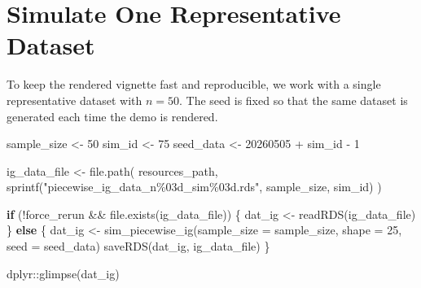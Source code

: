 \documentclass[
  english,
  letterpaper,
  DIV=11,
  numbers=noendperiod]{scrartcl}
\newenvironment{Shaded}{\begin{snugshade}}{\end{snugshade}}
\newcommand{\AttributeTok}[1]{\textcolor[rgb]{0.40,0.45,0.13}{#1}}
\newcommand{\ConstantTok}[1]{\textcolor[rgb]{0.56,0.35,0.01}{#1}}
\newcommand{\ControlFlowTok}[1]{\textcolor[rgb]{0.00,0.23,0.31}{\textbf{#1}}}
\newcommand{\DecValTok}[1]{\textcolor[rgb]{0.68,0.00,0.00}{#1}}
\newcommand{\FunctionTok}[1]{\textcolor[rgb]{0.28,0.35,0.67}{#1}}
\newcommand{\NormalTok}[1]{\textcolor[rgb]{0.00,0.23,0.31}{#1}}
\newcommand{\OtherTok}[1]{\textcolor[rgb]{0.00,0.23,0.31}{#1}}
\newcommand{\SpecialCharTok}[1]{\textcolor[rgb]{0.37,0.37,0.37}{#1}}
\newcommand{\StringTok}[1]{\textcolor[rgb]{0.13,0.47,0.30}{#1}}
\begin{document}
\begin{Shaded}
\end{Shaded}

\section{Simulate One Representative
Dataset}\label{simulate-one-representative-dataset}

To keep the rendered vignette fast and reproducible, we work with a
single representative dataset with \(n=50\). The seed is fixed so that
the same dataset is generated each time the demo is rendered.

\begin{Shaded}
\begin{Highlighting}[]
\NormalTok{sample\_size }\OtherTok{\textless{}{-}} \DecValTok{50}
\NormalTok{sim\_id }\OtherTok{\textless{}{-}} \DecValTok{75}
\NormalTok{seed\_data }\OtherTok{\textless{}{-}} \DecValTok{20260505} \SpecialCharTok{+}\NormalTok{ sim\_id }\SpecialCharTok{{-}} \DecValTok{1}

\NormalTok{ig\_data\_file }\OtherTok{\textless{}{-}} \FunctionTok{file.path}\NormalTok{(}
\NormalTok{  resources\_path,}
  \FunctionTok{sprintf}\NormalTok{(}\StringTok{"piecewise\_ig\_data\_n\%03d\_sim\%03d.rds"}\NormalTok{, sample\_size, sim\_id)}
\NormalTok{)}

\ControlFlowTok{if}\NormalTok{ (}\SpecialCharTok{!}\NormalTok{force\_rerun }\SpecialCharTok{\&\&} \FunctionTok{file.exists}\NormalTok{(ig\_data\_file)) \{}
\NormalTok{  dat\_ig }\OtherTok{\textless{}{-}} \FunctionTok{readRDS}\NormalTok{(ig\_data\_file)}
\NormalTok{\} }\ControlFlowTok{else}\NormalTok{ \{}
\NormalTok{  dat\_ig }\OtherTok{\textless{}{-}} \FunctionTok{sim\_piecewise\_ig}\NormalTok{(}\AttributeTok{sample\_size =}\NormalTok{ sample\_size, }\AttributeTok{shape =} \DecValTok{25}\NormalTok{, }\AttributeTok{seed =}\NormalTok{ seed\_data)}
  \FunctionTok{saveRDS}\NormalTok{(dat\_ig, ig\_data\_file)}
\NormalTok{\}}

\NormalTok{dplyr}\SpecialCharTok{::}\FunctionTok{glimpse}\NormalTok{(dat\_ig)}
\end{Highlighting}
\end{Shaded}
\end{document}

